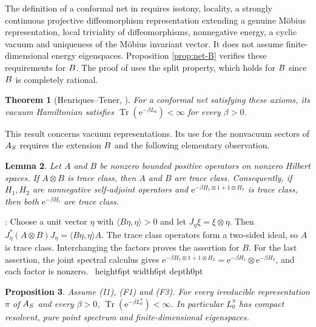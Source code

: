 \documentclass[leqno]{article}
\let\cal\relax
\newcommand{\cal}{\mathcal}
\newcommand{\qed}{\hfill \vrule height6pt  width6pt depth0pt}
\newcommand{\ot}{\otimes}
\newcommand{\e}{\mathrm{e}}
\newtheorem{thm}{Theorem}[section]
\newtheorem{prop}[thm]{Proposition}
\newtheorem{lemma}[thm]{Lemma}
\newenvironment{proof}[1][]{\noindent {\it Proof #1} : }{\hbox{~}\qed
\smallskip
}
\numberwithin{equation}{section}
\begin{document}
The definition of a conformal net in \cite[Definition 2.3, pp.~7--8]{HeT26} requires isotony, locality, a strongly continuous projective diffeomorphism representation extending a genuine M\"obius representation, local triviality of diffeomorphisms, nonnegative energy, a cyclic vacuum and uniqueness of the M\"obius invariant vector. It does not assume finite-dimensional energy eigenspaces. Proposition \ref{prop:net-B} verifies these requirements for $\cal B$. The proof of \cite[Theorem 4.1]{HeT26} uses the split property, which holds for $\cal B$ since $\cal B$ is completely rational.

\begin{thm}[Henriques--Tener, {\cite[Theorem 4.1, pp.~22--23]{HeT26}}]
\label{thm:HT-trace}
For a conformal net satisfying these axioms, its vacuum Hamiltonian satisfies $\operatorname{Tr}(\e^{-\beta L_0}) < \infty$ for every $\beta > 0$.
\end{thm}

This result concerns vacuum representations. Its use for the nonvacuum sectors of $\cal A_S$ requires the extension $\cal B$ and the following elementary observation.

\begin{lemma}
\label{lem:tensor-trace}
Let $A$ and $B$ be nonzero bounded positive operators on nonzero Hilbert spaces. If $A\ot B$ is trace class, then $A$ and $B$ are trace class. Consequently, if $H_1,H_2$ are nonnegative self-adjoint operators and $\e^{-\beta\overline{H_1\ot1+1\ot H_2}}$ is trace class, then both $\e^{-\beta H_i}$ are trace class.
\end{lemma}

\begin{proof}
Choose a unit vector $\eta$ with $\langle B\eta,\eta\rangle > 0$ and let $J_\eta\xi = \xi\ot\eta$. Then $J_\eta^*(A\ot B)J_\eta = \langle B\eta,\eta\rangle A$. The trace class operators form a two-sided ideal, so $A$ is trace class. Interchanging the factors proves the assertion for $B$. For the last assertion, the joint spectral calculus gives $\e^{-\beta\overline{H_1\ot1+1\ot H_2}} = \e^{-\beta H_1}\ot\e^{-\beta H_2}$, and each factor is nonzero.
\end{proof}

\begin{prop}
\label{prop:sector-trace}
Assume \textup{(I1)}, \textup{(F1)} and \textup{(F3)}. For every irreducible representation $\pi$ of $\cal A_S$ and every $\beta > 0$, $\operatorname{Tr}(\e^{-\beta L_0^\pi}) < \infty$. In particular $L_0^\pi$ has compact resolvent, pure point spectrum and finite-dimensional eigenspaces.
\end{prop}
\end{document}
